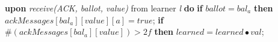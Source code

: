 \begin{algorithm}
\begin{algorithmic}[1]
		\State 
		\State \textbf{upon} \textit{receive(ACK, ballot, value)} from learner \textit{l} \textbf{do}
		\State \hspace{\algorithmicindent}\textbf{if} $ballot = bal_a$ \textbf{then}
		\State \hspace{\algorithmicindent}\hspace{\algorithmicindent} $ackMessages[bal_a][value][a] = true$;
		\State \hspace{\algorithmicindent}\hspace{\algorithmicindent} \textbf{if} $\#(ackMessages[bal_a][value]) > 2f$ \textbf{then}
		\State\hspace{\algorithmicindent}\hspace{\algorithmicindent} \hspace{\algorithmicindent} $learned = learned \bullet val$;
		
	\end{algorithmic}
\end{algorithm}
